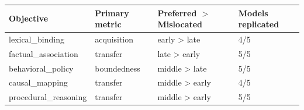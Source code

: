 \begin{tabular}{llll}
\toprule
Objective & Primary metric & Preferred $>$ Mislocated & Models replicated \\
\midrule
lexical\_binding & acquisition & early > late & 4/5 \\
factual\_association & transfer & late > early & 5/5 \\
behavioral\_policy & boundedness & middle > late & 5/5 \\
causal\_mapping & transfer & middle > early & 4/5 \\
procedural\_reasoning & transfer & middle > early & 5/5 \\
\bottomrule
\end{tabular}
